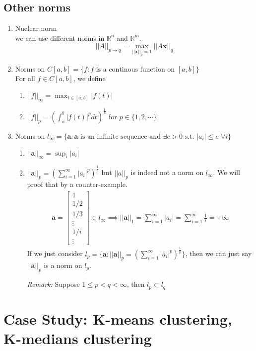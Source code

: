 \documentclass[11pt]{article}
\newcommand{\R}{\mathbb{R}}
\newcommand{\vx}{\mathbf{x}}
\newcommand{\st}{\text{ s.t. }}
\begin{document}
\subsection{Other norms}
\begin{enumerate}
\item Nuclear norm\\
we can use different norms in $\mathbb{R}^n$ and $\R^m$. $$||A||_{p \to q} = \max_{||\vx||_p = 1} ||A\vx||_q$$
\item Norms on $C[a,b] = \{f: f \text{ is a continous function on } [a, b] \}$\\
For all $f \in C[a, b]$, we define 
\begin{enumerate}
\item $||f||_{\infty} = \max_{t \in [a,b]} |f(t)|$
\item $||f||_p = (\int_{a}^{b} |f(t)|^p dt)^{\frac{1}{p}}$ for $p \in \{1, 2, \cdots \}$
\end{enumerate}

\item Norms on $l_{\infty} = \{\mathbf{a}: \mathbf{a} \text{ is an infinite sequence and } \exists c > 0 \st |a_i| \leq c \,\, \forall i\}$
\begin{enumerate}
\item $||\mathbf{a}||_{\infty} = \sup_{i} |a_i|$
\item $||\mathbf{a}||_{p} = (\sum_{i=1}^{\infty} |a_i|^p) ^{\frac{1}{p}}$ but $||a||_{p}$ is indeed not a norm on $l_{\infty}$. We will proof that by a counter-example.
\begin{align*}
\mathbf{a} = \begin{bmatrix}
1\\ 1/2\\ 1/3\\ \vdots\\ 1/i\\ \vdots
\end{bmatrix} \in l_{\infty} \implies ||\mathbf{a}||_1 = \sum_{i=1}^{\infty} |a_i| = \sum_{i=1}^{\infty} {\frac{1}{i}} = + \infty
\end{align*}
If we just consider $l_{p} = \{\mathbf{a}: ||\mathbf{a}||_{p} =  (\sum_{i=1}^{\infty} |a_i|^p) ^{\frac{1}{p}}\}$, then we can just say $||\mathbf{a}||_p$ is a norm on $l_p$.

\textit{Remark:} Suppose $1 \leq p < q < \infty$, then $l_{p} \subset l_{q}$
\end{enumerate}
\end{enumerate}

\section{Case Study: K-means clustering, K-medians clustering}
\end{document}
